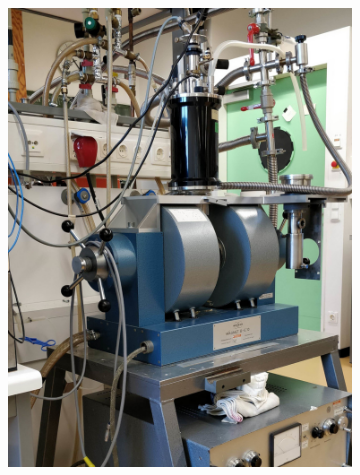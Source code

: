 \documentclass[11pt,a4paper]{article}
\begin{document}
\begin{figure}[H]
\centering
\begin{subfigure}[b]{0.45\textwidth}
\includegraphics[width=\textwidth]{Experimental_setup}
\caption{}
\label{fig:experimental_setup}
\end{subfigure}
\begin{subfigure}[b]{0.45\textwidth}

\end{subfigure}
\end{figure}
\end{document}
